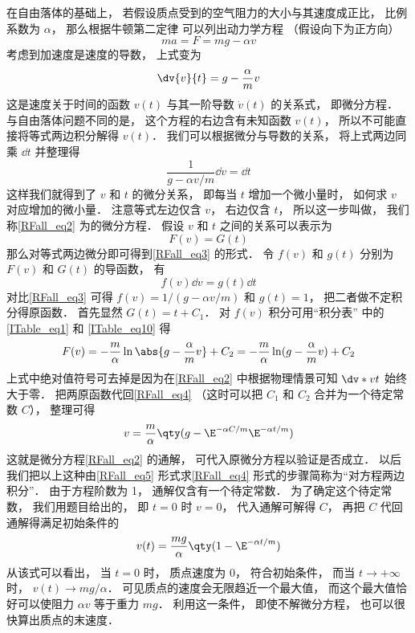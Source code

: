

在自由落体的基础上， 若假设质点受到的空气阻力的大小与其速度成正比， 比例系数为 $\alpha$， 那么根据牛顿第二定律 可以列出动力学方程 （假设向下为正方向）
\begin{equation}
ma = F = mg - \alpha v
\end{equation}
考虑到加速度是速度的导数， 上式变为
\begin{equation}\label{RFall_eq2}
\dv{v}{t} = g - \frac{\alpha}{m} v
\end{equation}
这是速度关于时间的函数 $v(t)$ 与其一阶导数 $\dot v(t)$ 的关系式， 即微分方程． 与自由落体问题不同的是， 这个方程的右边含有未知函数 $v(t)$， 所以不可能直接将等式两边积分解得 $v(t)$． 我们可以根据微分与导数的关系， 将上式两边同乘 $\dd{t}$ 并整理得
\begin{equation}\label{RFall_eq3}
\frac{1}{g - \alpha v/m} \dd{v} = \dd{t}
\end{equation}
这样我们就得到了 $v$ 和 $t$ 的微分关系， 即每当 $t$ 增加一个微小量时， 如何求 $v$ 对应增加的微小量． 注意等式左边仅含 $v$， 右边仅含 $t$， 所以这一步叫做， 我们称\autoref{RFall_eq2} 为的微分方程． 假设 $v$ 和 $t$ 之间的关系可以表示为
\begin{equation}\label{RFall_eq4}
F(v) = G(t)
\end{equation}
那么对等式两边微分即可得到\autoref{RFall_eq3} 的形式． 令 $f(v)$ 和 $g(t)$ 分别为 $F(v)$ 和 $G(t)$ 的导函数， 有
\begin{equation}\label{RFall_eq5}
f(v) \dd{v} = g(t) \dd{t}
\end{equation}
对比\autoref{RFall_eq3} 可得 $f(v) = 1/(g - \alpha v/m)$ 和 $g(t) = 1$， 把二者做不定积分得原函数． 首先显然 $G(t) = t + C_1$． 对 $f(v)$ 积分可用“积分表” 中的\autoref{ITable_eq1} 和 \autoref{ITable_eq10} 得
\begin{equation}
F(v) = -\frac m\alpha \ln\abs{g - \frac \alpha m v} + C_2 = -\frac m\alpha \ln(g - \frac \alpha m v) + C_2
\end{equation}
 上式中绝对值符号可去掉是因为在\autoref{RFall_eq2} 中根据物理情景可知 $\dv*{v}{t}$ 始终大于零． 把两原函数代回\autoref{RFall_eq4} （这时可以把 $C_1$ 和 $C_2$ 合并为一个待定常数 $C$）， 整理可得
\begin{equation}
v = \frac m\alpha \qty( g - \E^{-\alpha C/m} \E^{-\alpha t/m} )
\end{equation}
这就是微分方程\autoref{RFall_eq2} 的通解， 可代入原微分方程以验证是否成立． 以后我们把以上这种由\autoref{RFall_eq5} 形式求\autoref{RFall_eq4} 形式的步骤简称为“对方程两边积分”． 由于方程阶数为 1， 通解仅含有一个待定常数． 为了确定这个待定常数， 我们用题目给出的， 即 $t = 0$ 时 $v = 0$， 代入通解可解得 $C$， 再把 $C$ 代回通解得满足初始条件的
\begin{equation}
v(t) = \frac{mg}{\alpha} \qty( 1- \E^{-\alpha t/m} )
\end{equation}
从该式可以看出， 当 $t = 0$ 时， 质点速度为 0， 符合初始条件， 而当 $t\to +\infty$ 时， $ v(t) \to mg/\alpha$． 可见质点的速度会无限趋近一个最大值， 而这个最大值恰好可以使阻力 $\alpha v$ 等于重力 $mg$． 利用这一条件， 即使不解微分方程， 也可以很快算出质点的末速度．

